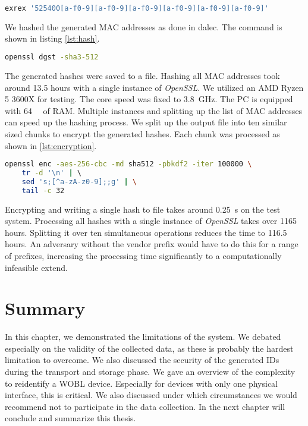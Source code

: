     \begin{lstlisting}[language=bash, caption=MAC generation with exrex, label=lst:exrex]
    exrex '525400[a-f0-9][a-f0-9][a-f0-9][a-f0-9][a-f0-9][a-f0-9]'
    \end{lstlisting}    
    
    We hashed the generated MAC addresses as done in dalec. The command is shown in listing \ref{lst:hash}.
    
    \begin{lstlisting}[language=bash, caption=MAC hashing with OpenSSL, label=lst:hash]
        openssl dgst -sha3-512
    \end{lstlisting}
    
    The generated hashes were saved to a file. Hashing all MAC addresses took around 13.5 hours with a single instance of \textit{OpenSSL}.
    We utilized an AMD Ryzen 5 3600X for testing. The core speed was fixed to \SIlist{3.8}{\giga\hertz}. The PC is equipped with \SIlist{64}{\giga\byte} of RAM.
    Multiple instances and splitting up the list of MAC addresses can speed up the hashing process.
    We split up the output file into ten similar sized chunks to encrypt the generated hashes. Each chunk was processed as shown in \ref{lst:encryption}.
    
    \begin{lstlisting}[language=bash, caption=ID encryption and truncation, label=lst:encryption]
    openssl enc -aes-256-cbc -md sha512 -pbkdf2 -iter 100000 \                                  -k "$key" -S "$salt" -base64 | \                                      
    tr -d '\n' | \                                                        
    sed 's;[^a-zA-z0-9];;g' | \
    tail -c 32
    \end{lstlisting}
    
    Encrypting and writing a single hash to file takes around \SIlist{0.25}{\second} on the test system. Processing all hashes with a single instance of \textit{OpenSSL} takes over 1165 hours. Splitting it over ten simultaneous operations reduces the time to 116.5 hours.
    An adversary without the vendor prefix would have to do this for a range of prefixes, increasing the processing time significantly to a computationally infeasible extend.
    
    
    

\section{Summary}
In this chapter, we demonstrated the limitations of the system. We debated especially on the validity of the collected data, as these is probably the hardest limitation to overcome.
We also discussed the security of the generated IDs during the transport and storage phase. We gave an overview of the complexity to reidentify a WOBL device. Especially for devices with only one physical interface, this is critical. We also discussed under which circumstances we would recommend not to participate in the data collection.
In the next chapter will conclude and summarize this thesis.

